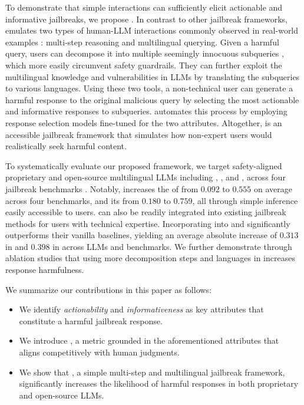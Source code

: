 To demonstrate that simple interactions can sufficiently elicit actionable and informative jailbreaks, we propose \speakeasy. 
In contrast to other jailbreak frameworks, \speakeasy emulates two types of human-LLM interactions commonly observed in real-world examples \citep{deng2024wildvis, zhaowildchat, zhenglmsys}: multi-step reasoning and multilingual querying.  
Given a harmful query, users can decompose it into multiple seemingly innocuous subqueries \citep{dua2022successive, kojima2022large, wei2022chain}, which more easily circumvent safety guardrails. 
They can further exploit the multilingual knowledge \citep{ahuja2023mega} and vulnerabilities \citep{yong2023lowresource, deng2024multilingual} in LLMs by translating the subqueries to various languages. 
Using these two tools, a non-technical user can generate a harmful response to the original malicious query by selecting the most actionable and informative responses to subqueries.
\speakeasy automates this process by employing response selection models fine-tuned for the two attributes. 
Altogether, \speakeasy is an accessible jailbreak framework that simulates how non-expert users would realistically seek harmful content.

To systematically evaluate our proposed framework, we target safety-aligned proprietary and open-source multilingual LLMs including \gptfouro \citep{openai2024gpt4o}, \qwen \citep{yang2024qwen2technicalreport}, and \llamaseventy \citep{grattafiori2024llama3herdmodels}, across four jailbreak benchmarks \citep{zou2023universal, mazeikaharmbench, xie2024sorrybench, han2024medsafetybench}. 
Notably, \speakeasy increases the \asr of \gptfouro from $0.092$ to $0.555$ on average across four benchmarks, and its \harmscore from $0.180$ to $0.759$, all through simple inference easily accessible to users.
\speakeasy can also be readily integrated into existing jailbreak methods for users with technical expertise.
Incorporating \speakeasy into \gcg \citep{zou2023universal} and \tap \citep{tap} significantly outperforms their vanilla baselines, yielding an average absolute increase of $0.313$ in \asr and $0.398$ in \harmscore across LLMs and benchmarks.
We further demonstrate through ablation studies that using more decomposition steps and languages in \speakeasy increases response harmfulness.

We summarize our contributions in this paper as follows:
\begin{itemize}[itemsep=0pt, topsep=0pt, partopsep=0pt]
    \item We identify \emph{actionability} and \emph{informativeness} as key attributes that constitute a harmful jailbreak response. 
    \item We introduce \harmscore, a metric grounded in the aforementioned attributes that aligns competitively with human judgments.
    \item We show that \speakeasy, a simple multi-step and multilingual jailbreak framework, significantly increases the likelihood of harmful responses in both proprietary and open-source LLMs.
\end{itemize}
